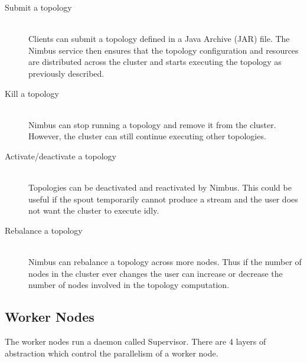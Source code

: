\documentclass[bsc,deptreport,twoside,singlespacing,normalheadings,parskip]{infthesis}\usepackage[]{graphicx}\usepackage[]{color}
\begin{document}
\begin{description}
	\item[Submit a topology] \hfill \\
	Clients can submit a topology defined in a Java Archive (JAR) file. The Nimbus service then ensures that the topology configuration and resources are distributed across the cluster and starts executing the topology as previously described.
	\item[Kill a topology] \hfill \\
	Nimbus can stop running a topology and remove it from the cluster. However, the cluster can still continue executing other topologies.
	\item[Activate/deactivate a topology] \hfill \\
	Topologies can be deactivated and reactivated by Nimbus. This could be useful if the spout temporarily cannot produce a stream and the user does not want the cluster to execute idly.
	\item[Rebalance a topology] \hfill \\
	Nimbus can rebalance a topology across more nodes. Thus if the number of nodes in the cluster ever changes the user can increase or decrease the number of nodes involved in the topology computation.
\end{description}

\subsection{Worker Nodes}

The worker nodes run a daemon called Supervisor. There are 4 layers of abstraction which control the parallelism of a worker node.
\end{document}
